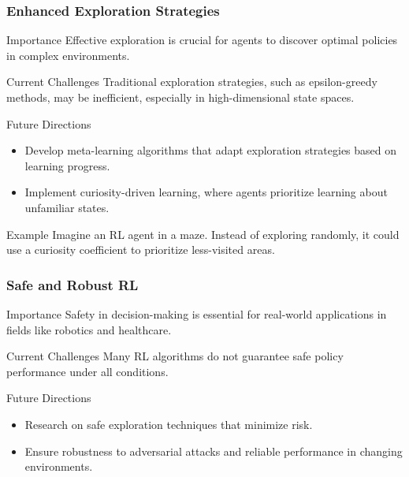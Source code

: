 \documentclass{beamer}
\begin{document}
\begin{frame}[fragile]
    \frametitle{Enhanced Exploration Strategies}
    \begin{block}{Importance}
        Effective exploration is crucial for agents to discover optimal policies in complex environments.
    \end{block}
    \begin{block}{Current Challenges}
        Traditional exploration strategies, such as epsilon-greedy methods, may be inefficient, especially in high-dimensional state spaces.
    \end{block}
    \begin{block}{Future Directions}
        \begin{itemize}
            \item Develop meta-learning algorithms that adapt exploration strategies based on learning progress.
            \item Implement curiosity-driven learning, where agents prioritize learning about unfamiliar states.
        \end{itemize}
    \end{block}
    \begin{block}{Example}
        Imagine an RL agent in a maze. Instead of exploring randomly, it could use a curiosity coefficient to prioritize less-visited areas.
    \end{block}
\end{frame}

\begin{frame}[fragile]
    \frametitle{Safe and Robust RL}
    \begin{block}{Importance}
        Safety in decision-making is essential for real-world applications in fields like robotics and healthcare.
    \end{block}
    \begin{block}{Current Challenges}
        Many RL algorithms do not guarantee safe policy performance under all conditions.
    \end{block}
    \begin{block}{Future Directions}
        \begin{itemize}
            \item Research on safe exploration techniques that minimize risk.
            \item Ensure robustness to adversarial attacks and reliable performance in changing environments.
        \end{itemize}
    \end{block}
\end{frame}
\end{document}
